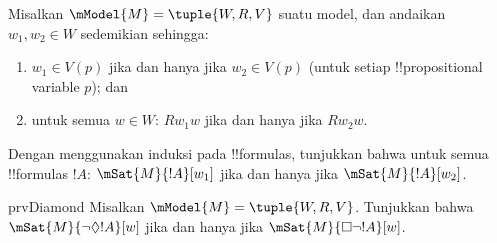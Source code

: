 \documentclass[../../../include/open-logic-section]{subfiles}
\begin{document}
\begin{prob}
  Misalkan $\mModel{M} = \tuple{W, R, V}$ suatu model, dan andaikan $w_1,
  w_2 \in W$ sedemikian sehingga:
  \begin{enumerate}
  \item $w_1 \in V(p)$ jika dan hanya jika $w_2 \in V(p)$ (untuk setiap
    !!{propositional variable} $p$); dan
  \item untuk semua $w \in W$: $Rw_1w$ jika dan hanya jika $Rw_2w$.
  \end{enumerate}
  Dengan menggunakan induksi pada !!{formula}s, tunjukkan bahwa untuk semua
  !!{formula}s $!A$: $\mSat{M}{!A}[w_1]$ jika dan hanya jika
  $\mSat{M}{!A}[w_2]$.
\end{prob}

\begin{probtag}{prvDiamond}
  Misalkan $\mModel{M} = \tuple{W, R, V}$. Tunjukkan bahwa
  $\mSat{M}{\lnot\Diamond !A}[w]$ jika dan hanya jika
  $\mSat{M}{\Box\lnot!A}[w]$.
\end{probtag}
\end{document}
